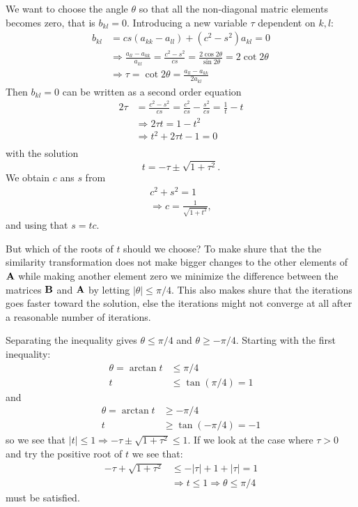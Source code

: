 \documentclass[11pt,a4wide]{article}
\begin{document}
We want to choose the angle $\theta$ so that all the non-diagonal matric elements becomes zero, that is $b_{kl} = 0$. Introducing a new variable $\tau$ dependent on $k,l$:
\begin{align*}
b_{kl} &= cs(a_{kk} - a_{ll}) + (c^2 - s^2)a_{kl} = 0\\
&\Rightarrow \frac{a_{ll}-a_{kk}}{a_{kl}} = \frac{c^2 - s^2}{cs} = \frac{2\cos{2\theta}}{\sin{2\theta}} = 2 \cot{2\theta}\\
&\Rightarrow \tau = \cot{2\theta} = \frac{a_{ll}-a_{kk}}{2a_{kl}}
\end{align*}
Then $b_{kl} = 0$ can be written as a second order equation
\begin{align*}
2\tau &= \frac{c^2 - s^2}{cs} = \frac{c^2}{cs} - \frac{s^2}{cs} = \frac{1}{t} - t\\
&\Rightarrow 2\tau t = 1 - t^2 \\
&\Rightarrow t^2 +2\tau t - 1 = 0\\
\end{align*}
with the solution
\[
t = -\tau \pm\sqrt{1 + \tau^2}.
\]
We obtain $c$ ans $s$ from
\begin{align*}
c^2 + s^2 = 1\\
\Rightarrow c = \frac{1}{\sqrt{1+t^2}},
\end{align*}
and using that $s=tc$.  

But which of the roots of $t$ should we choose? To make shure that the the similarity transformation does not make bigger changes to the other elements of $\bf A$ while making another element zero we minimize the difference between the matrices ${\bf B}$ and ${\bf A}$ by letting  $|\theta| \leq \pi /4$. This also makes shure that the iterations goes faster toward the solution, else the iterations might not converge at all after a reasonable number of iterations. 

Separating the inequality gives $\theta \leq \pi/4$ and $\theta \geq -\pi/4$. Starting with the first inequality:
\begin{align*}
\theta = \arctan t &\leq \pi/4 \\
t &\leq \tan (\pi/4) = 1
\end{align*}
and 
\begin{align*}
\theta = \arctan t &\geq -\pi/4 \\
t &\geq \tan(-\pi/4) = -1
\end{align*}
so we see that $|t| \leq 1\Rightarrow -\tau \pm \sqrt{1 + \tau^2} \leq 1$. If we look at the case where $\tau > 0$ and try the positive root of $t$ we see that:
\begin{align*}
-\tau + \sqrt{1 + \tau^2} &\leq -|\tau| + 1 + |\tau| = 1 \\
&\Rightarrow t \leq 1 \Rightarrow \theta \leq \pi/4
\end{align*}
must be satisfied.
\end{document}
